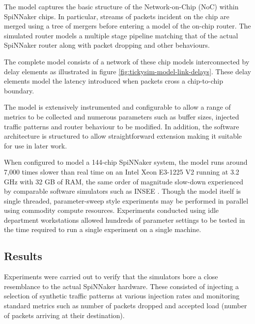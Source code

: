 			The model captures the basic structure of the Network-on-Chip (NoC) within
			SpiNNaker chips. In particular, streams of packets incident on the chip
			are merged using a tree of mergers before entering a model of the on-chip
			router. The simulated router models a multiple stage pipeline matching
			that of the actual SpiNNaker router along with packet dropping and other
			behaviours.
			
			The complete model consists of a network of these chip models
			interconnected by delay elements as illustrated in figure
			\ref{fig:tickysim-model-link-delays}.  These delay elements model the
			latency introduced when packets cross a chip-to-chip boundary.
			
			The model is extensively instrumented and configurable to allow a range of
			metrics to be collected and numerous parameters such as buffer sizes,
			injected traffic patterns and router behaviour to be modified. In
			addition, the software architecture is structured to allow straightforward
			extension making it suitable for use in later work.
			
			When configured to model a 144-chip SpiNNaker system, the model runs
			around 7,000 times slower than real time on an Intel Xeon E3-1225 V2
			running at 3.2 GHz with 32 GB of RAM, the same order of magnitude
			slow-down experienced by comparable software simulators such as INSEE
			\cite{navaridas11insee}. Though the model itself is single threaded,
			parameter-sweep style experiments may be performed in parallel using
			commodity compute resources. Experiments conducted using idle department
			workstations allowed hundreds of parameter settings to be tested in the
			time required to run a single experiment on a single machine.
		
		\subsection{Results}
			
			
			Experiments were carried out to verify that the simulators bore a close
			resemblance to the actual SpiNNaker hardware. These consisted of injecting
			a selection of synthetic traffic patterns at various injection rates and
			monitoring standard metrics such as number of packets dropped and accepted
			load (number of packets arriving at their destination).
			
